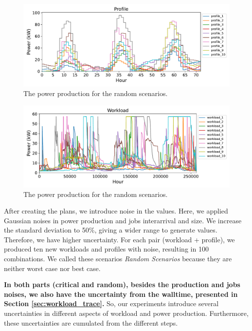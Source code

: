 \begin{figure}[!htb]
    \centering
    \includegraphics[scale=0.58]{Images/Compensations/diff_power_production.pdf}
    \caption{The power production for the random scenarios.}
    \label{fig:average_weather_with_noise}
\end{figure}

\begin{figure}[!htb]
    \centering
    \includegraphics[scale=0.58]{Images/Compensations/diff_jobs_arriving.pdf}
    \caption{The power production for the random scenarios.}
    \label{fig:average_workload_with_noise}
\end{figure}

After creating the plans, we introduce noise in the values. Here, we applied Gaussian noises in power production and jobs interarrival and size. We increase the standard deviation to 50\%, giving a wider range to generate values. Therefore, we have higher uncertainty. For each pair (workload + profile), we produced ten new workloads and profiles with noise, resulting in 100 combinations. We called these scenarios \emph{Random Scenarios} because they are neither worst case nor best case. 

\textbf{In both parts (critical and random), besides the production and jobs noises, we also have the uncertainty from the walltime, presented in Section \ref{sec:workload_trace}.} So, our experiments introduce several uncertainties in different aspects of workload and power production. Furthermore, these uncertainties are cumulated from the different steps.

